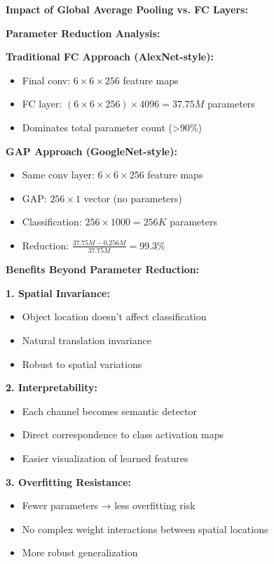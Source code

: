 \documentclass[12pt]{article}
\begin{document}
\begin{enumerate}[(a)]
{    \textbf{Impact of Global Average Pooling vs. FC Layers:}
    
    \textbf{Parameter Reduction Analysis:}
    
    \textbf{Traditional FC Approach (AlexNet-style):}
    \begin{itemize}
        \item Final conv: $6 \times 6 \times 256$ feature maps
        \item FC layer: $(6 \times 6 \times 256) \times 4096 = 37.75M$ parameters
        \item Dominates total parameter count (>90\%)
    \end{itemize}
    
    \textbf{GAP Approach (GoogleNet-style):}
    \begin{itemize}
        \item Same conv layer: $6 \times 6 \times 256$ feature maps
        \item GAP: $256 \times 1$ vector (no parameters)
        \item Classification: $256 \times 1000 = 256K$ parameters
        \item Reduction: $\frac{37.75M - 0.256M}{37.75M} = 99.3\%$
    \end{itemize}
    
    \textbf{Benefits Beyond Parameter Reduction:}
    
    \textbf{1. Spatial Invariance:}
    \begin{itemize}
        \item Object location doesn't affect classification
        \item Natural translation invariance
        \item Robust to spatial variations
    \end{itemize}
    
    \textbf{2. Interpretability:}
    \begin{itemize}
        \item Each channel becomes semantic detector
        \item Direct correspondence to class activation maps
        \item Easier visualization of learned features
    \end{itemize}
    
    \textbf{3. Overfitting Resistance:}
    \begin{itemize}
        \item Fewer parameters → less overfitting risk
        \item No complex weight interactions between spatial locations
        \item More robust generalization
    \end{itemize}
    
}
\end{enumerate}
\end{document}
